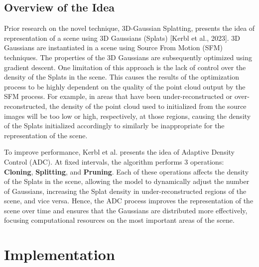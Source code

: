\documentclass[11pt]{report}
\begin{document}
\section{Overview of the Idea}
Prior research on the novel technique, 3D-Gaussian Splatting, presents the idea of representation of a scene using 3D Gaussians (Splats) [Kerbl et al., 2023]. 3D Gaussians are instantiated in a scene using Source From Motion (SFM) techniques. The properties of the 3D Gaussians are subsequently optimized using gradient descent. One limitation of this approach is the lack of control over the density of the Splats in the scene. This causes the results of the optimization process to be highly dependent on the quality of the point cloud output by the SFM process. For example, in areas that have been under-reconstructed or over-reconstructed, the density of the point cloud used to initialized from the source images will be too low or high, respectively, at those regions, causing the density of the Splats initialized accordingly to similarly be inappropriate for the representation of the scene.

To improve performance, Kerbl et al. presents the idea of Adaptive Density Control (ADC). At fixed intervals, the algorithm performs 3 operations: \textbf{Cloning}, \textbf{Splitting}, and \textbf{Pruning}. Each of these operations affects the density of the Splats in the scene, allowing the model to dynamically adjust the number of Gaussians, increasing the Splat density in under-reconstructed regions of the scene, and vice versa. Hence, the ADC process improves the representation of the scene over time and ensures that the Gaussians are distributed more effectively, focusing computational resources on the most important areas of the scene.



\chapter{Implementation}
\end{document}
